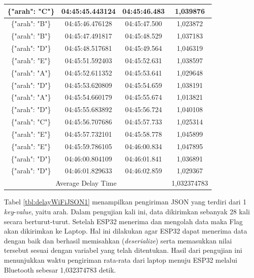 \begin{longtable}{|ccc|c|}
  \multicolumn{1}{|c|}{\{"arah": "C"\}} & \multicolumn{1}{c|}{04:45:45.443124} & 04:45:46.483       & 1,039876    \\ \hline
  \multicolumn{1}{|c|}{\{"arah": "B"\}} & \multicolumn{1}{c|}{04:45:46.476128} & 04:45:47.500       & 1,023872    \\ \hline
  \multicolumn{1}{|c|}{\{"arah": "B"\}} & \multicolumn{1}{c|}{04:45:47.491817} & 04:45:48.529       & 1,037183    \\ \hline
  \multicolumn{1}{|c|}{\{"arah": "D"\}} & \multicolumn{1}{c|}{04:45:48.517681} & 04:45:49.564       & 1,046319    \\ \hline
  \multicolumn{1}{|c|}{\{"arah": "E"\}} & \multicolumn{1}{c|}{04:45:51.592403} & 04:45:52.631       & 1,038597    \\ \hline
  \multicolumn{1}{|c|}{\{"arah": "A"\}} & \multicolumn{1}{c|}{04:45:52.611352} & 04:45:53.641       & 1,029648    \\ \hline
  \multicolumn{1}{|c|}{\{"arah": "D"\}} & \multicolumn{1}{c|}{04:45:53.620809} & 04:45:54.659       & 1,038191    \\ \hline
  \multicolumn{1}{|c|}{\{"arah": "A"\}} & \multicolumn{1}{c|}{04:45:54.660179} & 04:45:55.674       & 1,013821    \\ \hline
  \multicolumn{1}{|c|}{\{"arah": "D"\}} & \multicolumn{1}{c|}{04:45:55.683892} & 04:45:56.724       & 1,040108    \\ \hline
  \multicolumn{1}{|c|}{\{"arah": "C"\}} & \multicolumn{1}{c|}{04:45:56.707686} & 04:45:57.733       & 1,025314    \\ \hline
  \multicolumn{1}{|c|}{\{"arah": "E"\}} & \multicolumn{1}{c|}{04:45:57.732101} & 04:45:58.778       & 1,045899    \\ \hline
  \multicolumn{1}{|c|}{\{"arah": "E"\}} & \multicolumn{1}{c|}{04:45:59.786105} & 04:46:00.834       & 1,047895    \\ \hline
  \multicolumn{1}{|c|}{\{"arah": "D"\}} & \multicolumn{1}{c|}{04:46:00.804109} & 04:46:01.841       & 1,036891    \\ \hline
  \multicolumn{1}{|c|}{\{"arah": "D"\}} & \multicolumn{1}{c|}{04:46:01.829633} & 04:46:02.859       & 1,029367    \\ \hline
  \multicolumn{3}{|c|}{Average Delay Time}                                                          & 1,032374783 \\ \hline
  \end{longtable}

Tabel \ref{tbl:delayWiFiJSON1} menampilkan pengiriman JSON yang terdiri dari 1 \emph{key}-\emph{value}, yaitu arah. Dalam pengujian kali ini, data dikirimkan sebanyak 28 kali secara berturut-turut. Setelah ESP32 menerima dan mengolah data maka Flag akan dikirimkan ke Laptop. Hal ini dilakukan agar ESP32 dapat menerima data dengan baik dan berhasil memisahkan (\emph{deserialize}) serta memasukkan nilai tersebut sesuai dengan variabel yang telah ditentukan. Hasil dari pengujian ini menunjukkan waktu pengiriman rata-rata dari laptop menuju ESP32 melalui Bluetooth sebesar 1,032374783 detik.

